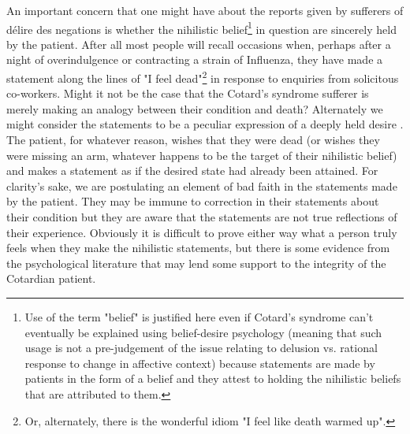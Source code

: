 An important concern that one might have about the reports given by sufferers of délire des negations is whether the nihilistic belief\footnote{Use of the term "belief" is justified here even if Cotard's syndrome can't eventually be explained using belief-desire psychology (meaning that such usage is not a pre-judgement of the issue relating to delusion vs. rational response to change in affective context) because statements are made by patients in the form of a belief and they attest to holding the nihilistic beliefs that are attributed to them.} in question are sincerely held by the patient. After all most people will recall occasions when, perhaps after a night of overindulgence or contracting a strain of Influenza, they have made a statement along the lines of "I feel dead"\footnote{Or, alternately, there is the wonderful idiom "I feel like death warmed up".} in response to enquiries from solicitous co-workers. Might it not be the case that the Cotard's syndrome sufferer is merely making an analogy between their condition and death? Alternately we might consider the statements to be a peculiar expression of a deeply held desire \cite{turnbull2004}. The patient, for whatever reason, wishes that they were dead (or wishes they were missing an arm, whatever happens to be the target of their nihilistic belief) and makes a statement as if the desired state had already been attained. For clarity's sake, we are postulating an element of bad faith in the statements made by the patient. They may be immune to correction in their statements about their condition but they are aware that the statements are not true reflections of their experience. Obviously it is difficult to prove either way what a person truly feels when they make the nihilistic statements, but there is some evidence from the psychological literature that may lend some support to the integrity of the Cotardian patient.

